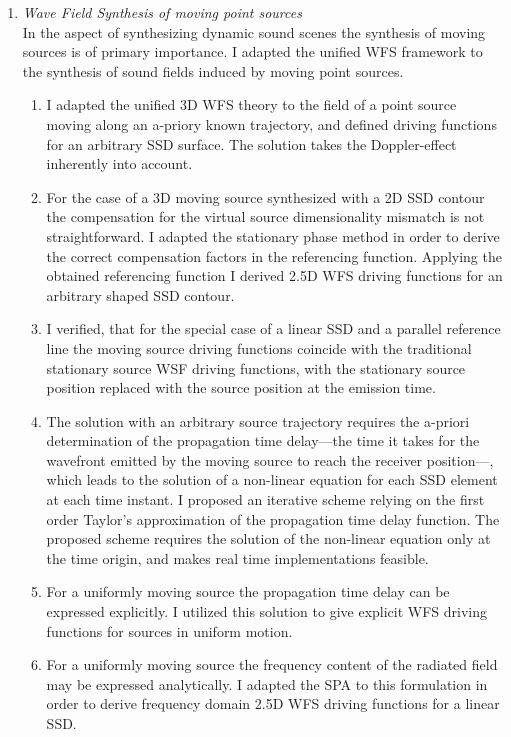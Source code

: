 \documentclass[a4paper,10pt]{article}
\begin{document}
\begin{enumerate}
\item \emph{Wave Field Synthesis of moving point sources}\\
In the aspect of synthesizing dynamic sound scenes the synthesis of moving sources is of primary importance.
I adapted the unified WFS framework to the synthesis of sound fields induced by moving point sources.
\begin{enumerate}
\item I adapted the unified 3D WFS theory to the field of a point source moving along an a-priory known trajectory, and defined driving functions for an arbitrary SSD surface.
The solution takes the Doppler-effect inherently into account.
\item For the case of a 3D moving source synthesized with a 2D SSD contour the compensation for the virtual source dimensionality mismatch is not straightforward.
I adapted the stationary phase method in order to derive the correct compensation factors in the referencing function. 
Applying the obtained referencing function I derived 2.5D WFS driving functions for an arbitrary shaped SSD contour.
\item I verified, that for the special case of a linear SSD and a parallel reference line the moving source driving functions coincide with the traditional stationary source WSF driving functions, with the stationary source position replaced with the source position at the emission time.
\item The solution with an arbitrary source trajectory requires the a-priori determination of the propagation time delay---the time it takes for the wavefront emitted by the moving source to reach the receiver position---, which leads to the solution of a non-linear equation for each SSD element at each time instant.
I proposed an iterative scheme relying on the first order Taylor's approximation of the propagation time delay function.
The proposed scheme requires the solution of the non-linear equation only at the time origin, and makes real time implementations feasible.
\item For a uniformly moving source the propagation time delay can be expressed explicitly.
I utilized this solution to give explicit WFS driving functions for sources in uniform motion.
\item For a uniformly moving source the frequency content of the radiated field may be expressed analytically.
I adapted the SPA to this formulation in order to derive frequency domain 2.5D WFS driving functions for a linear SSD.
\end{enumerate}


\end{enumerate}
\end{document}
